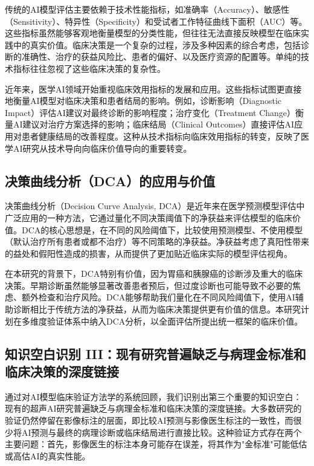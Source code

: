 传统的AI模型评估主要依赖于技术性能指标，如准确率（Accuracy）、敏感性（Sensitivity）、特异性（Specificity）和受试者工作特征曲线下面积（AUC）等。这些指标虽然能够客观地衡量模型的分类性能，但往往无法直接反映模型在临床实践中的真实价值。临床决策是一个复杂的过程，涉及多种因素的综合考虑，包括诊断的准确性、治疗的获益风险比、患者的偏好、以及医疗资源的配置等。单纯的技术指标往往忽视了这些临床决策的复杂性。

近年来，医学AI领域开始重视临床效用指标的发展和应用。这些指标试图更直接地衡量AI模型对临床决策和患者结局的影响。例如，诊断影响（Diagnostic Impact）评估AI建议对最终诊断的影响程度；治疗变化（Treatment Change）衡量AI建议对治疗方案选择的影响；临床结局（Clinical Outcomes）直接评估AI应用对患者健康结局的改善程度。这种从技术指标向临床效用指标的转变，反映了医学AI研究从技术导向向临床价值导向的重要转变。

\subsection{决策曲线分析（DCA）的应用与价值}

决策曲线分析（Decision Curve Analysis, DCA）是近年来在医学预测模型评估中广泛应用的一种方法，它通过量化不同决策阈值下的净获益来评估模型的临床价值。DCA的核心思想是，在不同的风险阈值下，比较使用预测模型、不使用模型（默认治疗所有患者或都不治疗）等不同策略的净获益。净获益考虑了真阳性带来的益处和假阳性造成的损害，从而提供了更加贴近临床实际的模型评估视角。

在本研究的背景下，DCA特别有价值，因为胃癌和胰腺癌的诊断涉及重大的临床决策。早期诊断虽然能够显著改善患者预后，但过度诊断也可能导致不必要的焦虑、额外检查和治疗风险。DCA能够帮助我们量化在不同风险阈值下，使用AI辅助诊断相比于传统方法的净获益，从而为临床决策提供更有价值的信息。本研究计划在多维度验证体系中纳入DCA分析，以全面评估所提出统一框架的临床价值。

\subsection{知识空白识别 III：现有研究普遍缺乏与病理金标准和临床决策的深度链接}

通过对AI模型临床验证方法学的系统回顾，我们识别出第三个重要的知识空白：现有的超声AI研究普遍缺乏与病理金标准和临床决策的深度链接。大多数研究的验证仍然停留在影像标注的层面，即比较AI预测与影像医生标注的一致性，而很少将AI预测与最终的病理诊断或临床结局进行直接比较。这种验证方式存在两个主要问题：首先，影像医生的标注本身可能存在误差，将其作为"金标准"可能低估或高估AI的真实性能。

